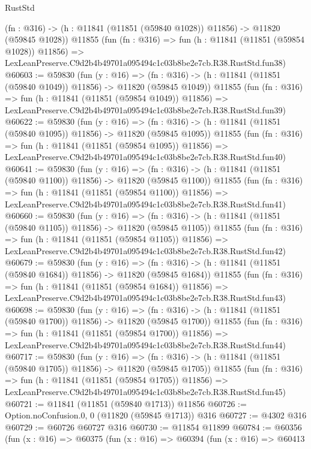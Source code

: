 \begin{lexlean}{RustStd}
\begin{coremodule}
    (fn : @316) -> (h : @11841 (@11851 (@59840 @1028)) @11856) -> @11820 (@59845 @1028))
    @11855
    (fun (fn : @316) =>
    fun (h : @11841 (@11851 (@59854 @1028)) @11856) =>
    LexLeanPreserve.C9d2b4b49701a095494c1c03b8be2e7cb.R38.RustStd.fun38)
@60603 := @59830
    (fun (y : @16) =>
    (fn : @316) -> (h : @11841 (@11851 (@59840 @1049)) @11856) -> @11820 (@59845 @1049))
    @11855
    (fun (fn : @316) =>
    fun (h : @11841 (@11851 (@59854 @1049)) @11856) =>
    LexLeanPreserve.C9d2b4b49701a095494c1c03b8be2e7cb.R38.RustStd.fun39)
@60622 := @59830
    (fun (y : @16) =>
    (fn : @316) -> (h : @11841 (@11851 (@59840 @1095)) @11856) -> @11820 (@59845 @1095))
    @11855
    (fun (fn : @316) =>
    fun (h : @11841 (@11851 (@59854 @1095)) @11856) =>
    LexLeanPreserve.C9d2b4b49701a095494c1c03b8be2e7cb.R38.RustStd.fun40)
@60641 := @59830
    (fun (y : @16) =>
    (fn : @316) -> (h : @11841 (@11851 (@59840 @1100)) @11856) -> @11820 (@59845 @1100))
    @11855
    (fun (fn : @316) =>
    fun (h : @11841 (@11851 (@59854 @1100)) @11856) =>
    LexLeanPreserve.C9d2b4b49701a095494c1c03b8be2e7cb.R38.RustStd.fun41)
@60660 := @59830
    (fun (y : @16) =>
    (fn : @316) -> (h : @11841 (@11851 (@59840 @1105)) @11856) -> @11820 (@59845 @1105))
    @11855
    (fun (fn : @316) =>
    fun (h : @11841 (@11851 (@59854 @1105)) @11856) =>
    LexLeanPreserve.C9d2b4b49701a095494c1c03b8be2e7cb.R38.RustStd.fun42)
@60679 := @59830
    (fun (y : @16) =>
    (fn : @316) -> (h : @11841 (@11851 (@59840 @1684)) @11856) -> @11820 (@59845 @1684))
    @11855
    (fun (fn : @316) =>
    fun (h : @11841 (@11851 (@59854 @1684)) @11856) =>
    LexLeanPreserve.C9d2b4b49701a095494c1c03b8be2e7cb.R38.RustStd.fun43)
@60698 := @59830
    (fun (y : @16) =>
    (fn : @316) -> (h : @11841 (@11851 (@59840 @1700)) @11856) -> @11820 (@59845 @1700))
    @11855
    (fun (fn : @316) =>
    fun (h : @11841 (@11851 (@59854 @1700)) @11856) =>
    LexLeanPreserve.C9d2b4b49701a095494c1c03b8be2e7cb.R38.RustStd.fun44)
@60717 := @59830
    (fun (y : @16) =>
    (fn : @316) -> (h : @11841 (@11851 (@59840 @1705)) @11856) -> @11820 (@59845 @1705))
    @11855
    (fun (fn : @316) =>
    fun (h : @11841 (@11851 (@59854 @1705)) @11856) =>
    LexLeanPreserve.C9d2b4b49701a095494c1c03b8be2e7cb.R38.RustStd.fun45)
@60721 := @11841 (@11851 (@59840 @1713)) @11856
@60726 := Option.noConfusion.{0, 0} (@11820 (@59845 @1713)) @316
@60727 := @4302 @316
@60729 := @60726 @60727 @316
@60730 := @11854 @11899
@60784 := @60356
    (fun (x : @16) =>
    @60375
      (fun (x : @16) =>
      @60394
        (fun (x : @16) =>
        @60413

\end{coremodule}
\end{lexlean}
